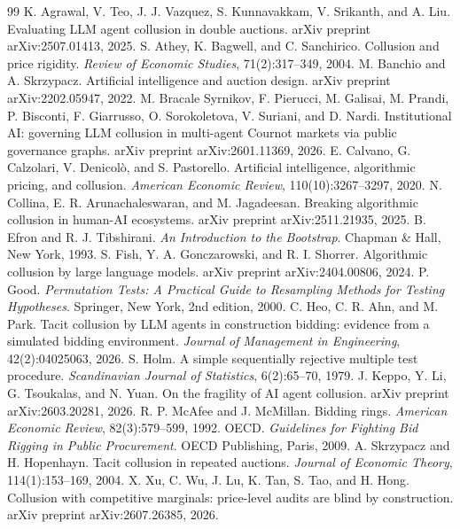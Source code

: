 \documentclass[10pt]{article}
\begin{document}
\begin{thebibliography}{99}\small
\setlength{\itemsep}{0.15em}
 K. Agrawal, V. Teo, J. J. Vazquez, S. Kunnavakkam, V. Srikanth, and A. Liu. Evaluating LLM agent collusion in double auctions. arXiv preprint arXiv:2507.01413, 2025.
 S. Athey, K. Bagwell, and C. Sanchirico. Collusion and price rigidity. \emph{Review of Economic Studies}, 71(2):317--349, 2004.
 M. Banchio and A. Skrzypacz. Artificial intelligence and auction design. arXiv preprint arXiv:2202.05947, 2022.
 M. Bracale Syrnikov, F. Pierucci, M. Galisai, M. Prandi, P. Bisconti, F. Giarrusso, O. Sorokoletova, V. Suriani, and D. Nardi. Institutional AI: governing LLM collusion in multi-agent Cournot markets via public governance graphs. arXiv preprint arXiv:2601.11369, 2026.
 E. Calvano, G. Calzolari, V. Denicol\`o, and S. Pastorello. Artificial intelligence, algorithmic pricing, and collusion. \emph{American Economic Review}, 110(10):3267--3297, 2020.
 N. Collina, E. R. Arunachaleswaran, and M. Jagadeesan. Breaking algorithmic collusion in human-AI ecosystems. arXiv preprint arXiv:2511.21935, 2025.
 B. Efron and R. J. Tibshirani. \emph{An Introduction to the Bootstrap}. Chapman \& Hall, New York, 1993.
 S. Fish, Y. A. Gonczarowski, and R. I. Shorrer. Algorithmic collusion by large language models. arXiv preprint arXiv:2404.00806, 2024.
 P. Good. \emph{Permutation Tests: A Practical Guide to Resampling Methods for Testing Hypotheses}. Springer, New York, 2nd edition, 2000.
 C. Heo, C. R. Ahn, and M. Park. Tacit collusion by LLM agents in construction bidding: evidence from a simulated bidding environment. \emph{Journal of Management in Engineering}, 42(2):04025063, 2026.
 S. Holm. A simple sequentially rejective multiple test procedure. \emph{Scandinavian Journal of Statistics}, 6(2):65--70, 1979.
 J. Keppo, Y. Li, G. Tsoukalas, and N. Yuan. On the fragility of AI agent collusion. arXiv preprint arXiv:2603.20281, 2026.
 R. P. McAfee and J. McMillan. Bidding rings. \emph{American Economic Review}, 82(3):579--599, 1992.
 OECD. \emph{Guidelines for Fighting Bid Rigging in Public Procurement}. OECD Publishing, Paris, 2009.
 A. Skrzypacz and H. Hopenhayn. Tacit collusion in repeated auctions. \emph{Journal of Economic Theory}, 114(1):153--169, 2004.
 X. Xu, C. Wu, J. Lu, K. Tan, S. Tao, and H. Hong. Collusion with competitive marginals: price-level audits are blind by construction. arXiv preprint arXiv:2607.26385, 2026.
\end{thebibliography}
\end{document}
